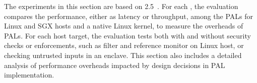 The experiments in this section are based on \lmbench{} 2.5~\cite{McVoy:lmbench}.
For each \hostapi{}, the evaluation %
compares the performance, either as latency or throughput, among the PALs for Linux and SGX hosts
and a native Linux kernel,
to measure the overheads of PALs.
For each host target,
the evaluation tests both with and without security checks or enforcements,
such as \seccomp{} filter and reference monitor on Linux host,
or checking untrusted inputs in an enclave.
This section also includes a detailed analysis
of performance overheads
impacted by design decisions in PAL implementation. 



















